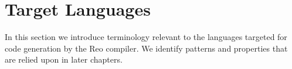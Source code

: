 %
%	
%	
%	

\section{Target Languages}
In this section we introduce terminology relevant to the languages targeted for code generation by the Reo compiler. We identify patterns and properties that are relied upon in later chapters.

